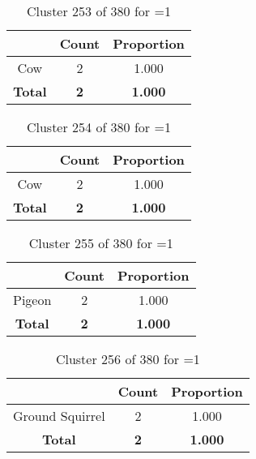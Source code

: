 \begin{table}[ht!]
\centering
\begin{tabular}{|c|c|c|}
\hline
\bf \Spec{} &\bf Count &\bf Proportion\\ \hline \hline
Cow & 2 & 1.000\\ \hline
\hline
\bf Total & \bf 2 & \bf 1.000\\ \hline
\end{tabular}
\label{tab:cluster:253:1}
\caption{Cluster 253 of 380 for \minneigh{}=1}
\end{table}

\begin{table}[ht!]
\centering
\begin{tabular}{|c|c|c|}
\hline
\bf \Spec{} &\bf Count &\bf Proportion\\ \hline \hline
Cow & 2 & 1.000\\ \hline
\hline
\bf Total & \bf 2 & \bf 1.000\\ \hline
\end{tabular}
\label{tab:cluster:254:1}
\caption{Cluster 254 of 380 for \minneigh{}=1}
\end{table}

\begin{table}[ht!]
\centering
\begin{tabular}{|c|c|c|}
\hline
\bf \Spec{} &\bf Count &\bf Proportion\\ \hline \hline
Pigeon & 2 & 1.000\\ \hline
\hline
\bf Total & \bf 2 & \bf 1.000\\ \hline
\end{tabular}
\label{tab:cluster:255:1}
\caption{Cluster 255 of 380 for \minneigh{}=1}
\end{table}

\begin{table}[ht!]
\centering
\begin{tabular}{|c|c|c|}
\hline
\bf \Spec{} &\bf Count &\bf Proportion\\ \hline \hline
Ground Squirrel & 2 & 1.000\\ \hline
\hline
\bf Total & \bf 2 & \bf 1.000\\ \hline
\end{tabular}
\label{tab:cluster:256:1}
\caption{Cluster 256 of 380 for \minneigh{}=1}
\end{table}

